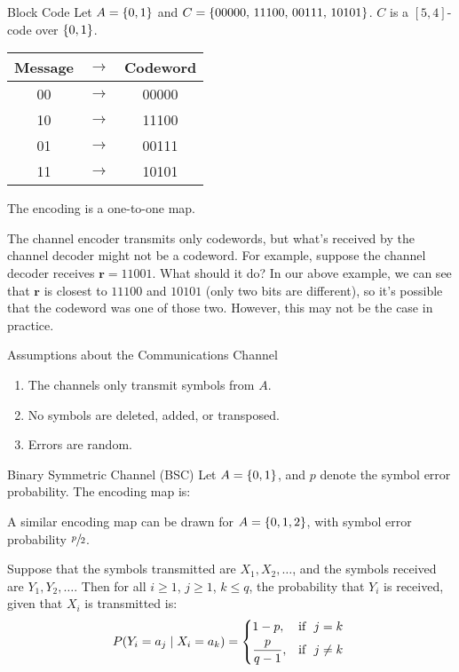 \begin{Example}{Block Code}{}
    Let $ A=\{0,1\} $ and $ C=\{00000,\,11100,\,00111,\,10101\} $.
    $ C $ is a $ [5,4] $-code over $ \{0,1\} $.
    \begin{table}[H]
        \centering
        \begin{tabular}{@{}ccc@{}}
            Message & $ \rightarrow $ & Codeword \\
            \midrule
            00      & $ \rightarrow $ & 00000    \\
            10      & $ \rightarrow $ & 11100    \\
            01      & $ \rightarrow $ & 00111    \\
            11      & $ \rightarrow $ & 10101    \\
        \end{tabular}
    \end{table}
    The encoding is a one-to-one map.
\end{Example}

The channel encoder transmits only codewords, but what's received by the channel
decoder might not be a codeword. For example, suppose the channel decoder
receives $ \symbf{r}=11001 $. What should it do? In our above example, we can see
that $ \symbf{r} $ is closest to $ 11100 $ and $ 10101 $ (only two bits are different),
so it's possible that the codeword was one of those two. However,
this may not be the case in practice.

\begin{Definition}{Assumptions about the Communications Channel}{}
    \begin{enumerate}[label=(\Roman*)]
        \item The channels only transmit symbols from $ A $.
        \item No symbols are deleted, added, or transposed.
        \item Errors are random.
    \end{enumerate}
\end{Definition}

\begin{Example}{Binary Symmetric Channel (BSC)}{}
    Let $ A=\{0,1\} $, and $ p $ denote the symbol error probability.
    The encoding map is:
    \begin{center}
        
    \end{center}
    A similar encoding map can be drawn for $ A=\{0,1,2\} $,
    with symbol error probability $ \sfrac{p}{2} $.

    Suppose that the symbols transmitted are $ X_1,X_2,\ldots $,
    and the symbols received are $ Y_1,Y_2,\ldots $. Then for all
    $ i\geqslant 1 $, $ j\geqslant 1 $, $ k\leqslant q $, the probability
    that $ Y_i $ is received, given that $ X_i $ is transmitted is:
    \[ P(Y_i=a_j\mid X_i=a_k)=
        \begin{dcases*}
            1-p,           & \text{if } $ j=k $      \\
            \frac{p}{q-1}, & \text{if } $ j\neq{}k $
        \end{dcases*} \]
\end{Example}

